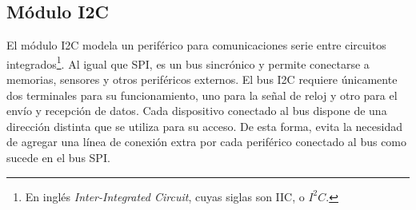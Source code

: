 \subsection{Módulo I2C}

El módulo I2C modela un periférico para comunicaciones serie entre circuitos integrados\footnote{En inglés \emph{Inter-Integrated Circuit}, cuyas siglas son IIC, o $I^{2}C$.}. Al igual que SPI, es un bus sincrónico y permite conectarse a memorias, sensores y otros periféricos externos. El bus I2C requiere únicamente dos terminales para su funcionamiento, uno para la señal de reloj y otro para el envío y recepción de datos. Cada dispositivo conectado al bus dispone de una dirección distinta que se utiliza para su acceso. De esta forma, evita la necesidad de agregar una línea de conexión extra por cada periférico conectado al bus como sucede en el bus SPI.


